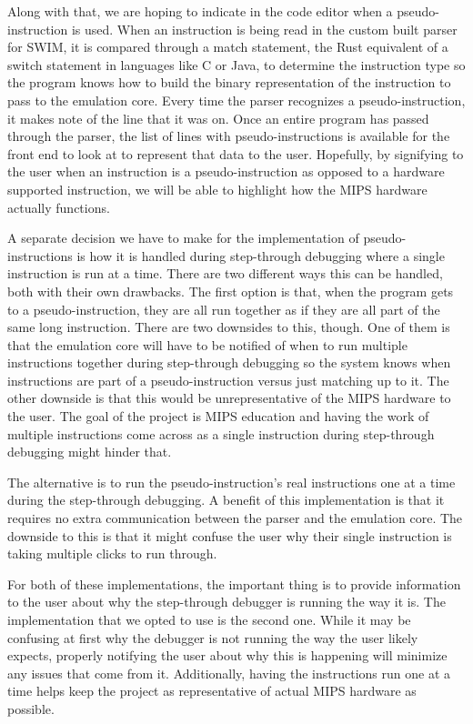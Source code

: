 \documentclass[
    paper=letter,
    parskip=half,
    fontsize=12pt,
    titlepage=firstiscover,
    toc=bibliography,
    numbers=endperiod
]{scrartcl}
\begin{document}
Along with that, we are hoping to indicate in the code editor when a
pseudo-instruction is used. When an instruction is being read in the
custom built parser for SWIM, it is compared through a match statement,
the Rust equivalent of a switch statement in languages like C or Java,
to determine the instruction type so the program knows how to build the
binary representation of the instruction to pass to the emulation core.
Every time the parser recognizes a pseudo-instruction, it makes note of
the line that it was on. Once an entire program has passed through the
parser, the list of lines with pseudo-instructions is available for the
front end to look at to represent that data to the user. Hopefully, by
signifying to the user when an instruction is a pseudo-instruction as
opposed to a hardware supported instruction, we will be able to
highlight how the MIPS hardware actually functions.

A separate decision we have to make for the implementation of
pseudo-instructions is how it is handled during step-through debugging
where a single instruction is run at a time. There are two different
ways this can be handled, both with their own drawbacks. The first
option is that, when the program gets to a pseudo-instruction, they are
all run together as if they are all part of the same long instruction.
There are two downsides to this, though. One of them is that the
emulation core will have to be notified of when to run multiple
instructions together during step-through debugging so the system knows
when instructions are part of a pseudo-instruction versus just matching
up to it. The other downside is that this would be unrepresentative of
the MIPS hardware to the user. The goal of the project is MIPS education
and having the work of multiple instructions come across as a single
instruction during step-through debugging might hinder that.

The alternative is to run the pseudo-instruction's real instructions one
at a time during the step-through debugging. A benefit of this
implementation is that it requires no extra communication between the
parser and the emulation core. The downside to this is that it might
confuse the user why their single instruction is taking multiple clicks
to run through.

For both of these implementations, the important thing is to provide
information to the user about why the step-through debugger is running
the way it is. The implementation that we opted to use is the second
one. While it may be confusing at first why the debugger is not running
the way the user likely expects, properly notifying the user about why
this is happening will minimize any issues that come from it.
Additionally, having the instructions run one at a time helps keep the
project as representative of actual MIPS hardware as possible.
\end{document}
